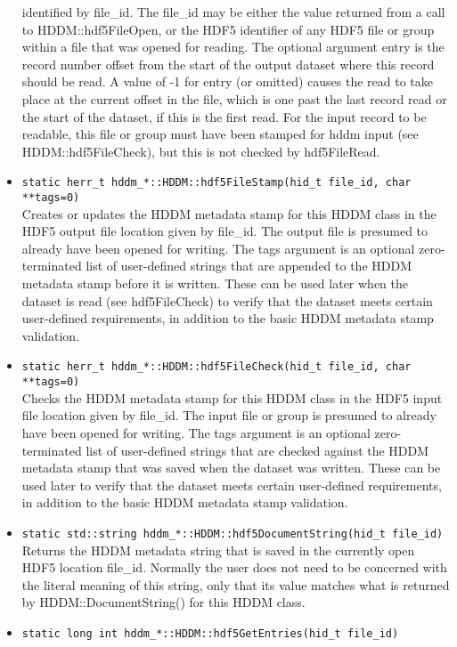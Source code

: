 \documentclass{revtex4}
\begin{document}
\begin{itemize}
identified by file\_id. The file\_id may be either the value returned
from a call to HDDM::hdf5FileOpen, or the HDF5 identifier of any HDF5
file or group within a file that was opened for reading. The optional 
argument entry is the record number offset from the start of the output
dataset where this record should be read. A value of -1 for entry (or
omitted) causes the read to take place at the current offset in the file,
which is one past the last record read or the start of the dataset, if
this is the first read. For the input record to be readable, this file
or group must have been stamped for hddm input (see HDDM::hdf5FileCheck),
but this is not checked by hdf5FileRead. 
\item \texttt{static herr\_t hddm\_*::HDDM::hdf5FileStamp(hid\_t file\_id, char **tags=0)}\\
Creates or updates the HDDM metadata stamp for this HDDM class in the
HDF5 output file location given by file\_id. The output file is presumed
to already have been opened for writing. The tags argument is an optional
zero-terminated list of user-defined strings that are appended to the HDDM
metadata stamp before it is written. These can be used later when the dataset
is read (see hdf5FileCheck) to verify that the dataset meets certain 
user-defined requirements, in addition to the basic HDDM metadata stamp
validation.
\item \texttt{static herr\_t hddm\_*::HDDM::hdf5FileCheck(hid\_t file\_id, char **tags=0)}\\
Checks the HDDM metadata stamp for this HDDM class in the HDF5 input file 
location given by file\_id. The input file or group is presumed to already
have been opened for writing. The tags argument is an optional zero-terminated
list of user-defined strings that are checked against the HDDM metadata stamp
that was saved when the dataset was written. These can be used later to verify
that the dataset meets certain user-defined requirements, in addition to the
basic HDDM metadata stamp validation.
\item \texttt{static std::string hddm\_*::HDDM::hdf5DocumentString(hid\_t file\_id)}\\
Returns the HDDM metadata string that is saved in the currently open HDF5
location file\_id. Normally the user does not need to be concerned with the
literal meaning of this string, only that its value matches what is returned by
HDDM::DocumentString() for this HDDM class.
\item \texttt{static long int hddm\_*::HDDM::hdf5GetEntries(hid\_t file\_id)}\\

\end{itemize}
\end{document}
